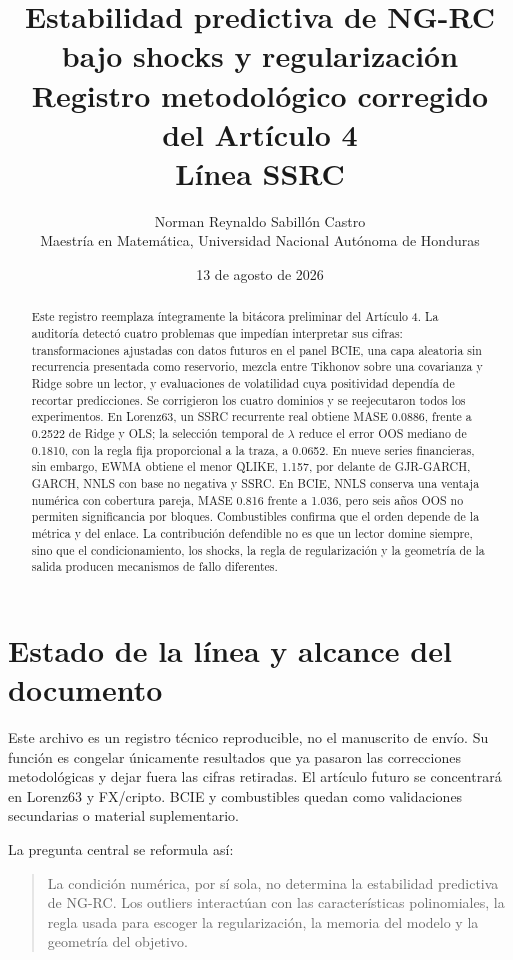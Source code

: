 \documentclass[11pt]{article}
\title{Estabilidad predictiva de NG-RC bajo shocks y regularización\\
\large Registro metodológico corregido del Artículo 4\\
\normalsize Línea SSRC}
\author{Norman Reynaldo Sabillón Castro\\
\small Maestría en Matemática, Universidad Nacional Autónoma de Honduras}
\date{13 de agosto de 2026}
\begin{document}
\maketitle

\begin{abstract}
Este registro reemplaza íntegramente la bitácora preliminar del Artículo 4. La auditoría detectó
cuatro problemas que impedían interpretar sus cifras: transformaciones ajustadas con datos
futuros en el panel BCIE, una capa aleatoria sin recurrencia presentada como reservorio, mezcla
entre Tikhonov sobre una covarianza y Ridge sobre un lector, y evaluaciones de volatilidad cuya
positividad dependía de recortar predicciones. Se corrigieron los cuatro dominios y se
reejecutaron todos los experimentos. En Lorenz63, un SSRC recurrente real obtiene MASE 0.0886,
frente a 0.2522 de Ridge y OLS; la selección temporal de $\lambda$ reduce el error OOS mediano
de 0.1810, con la regla fija proporcional a la traza, a 0.0652. En nueve series financieras,
sin embargo, EWMA obtiene el menor QLIKE, 1.157, por delante de GJR-GARCH, GARCH, NNLS con base
no negativa y SSRC. En BCIE, NNLS conserva una ventaja numérica con cobertura pareja, MASE
0.816 frente a 1.036, pero seis años OOS no permiten significancia por bloques. Combustibles
confirma que el orden depende de la métrica y del enlace. La contribución defendible no es que
un lector domine siempre, sino que el condicionamiento, los shocks, la regla de regularización
y la geometría de la salida producen mecanismos de fallo diferentes.
\end{abstract}

\tableofcontents

\section{Estado de la línea y alcance del documento}

Este archivo es un registro técnico reproducible, no el manuscrito de envío. Su función es
congelar únicamente resultados que ya pasaron las correcciones metodológicas y dejar fuera las
cifras retiradas. El artículo futuro se concentrará en Lorenz63 y FX/cripto. BCIE y combustibles
quedan como validaciones secundarias o material suplementario.

La pregunta central se reformula así:

\begin{quote}
La condición numérica, por sí sola, no determina la estabilidad predictiva de NG-RC. Los
outliers interactúan con las características polinomiales, la regla usada para escoger la
regularización, la memoria del modelo y la geometría del objetivo.
\end{quote}
\end{document}
